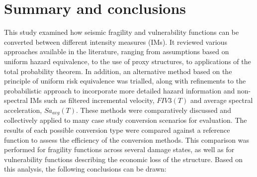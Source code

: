 \section{Summary and conclusions}
This study examined how seismic fragility and vulnerability functions can be converted between different intensity measures (IMs). It reviewed various approaches available in the literature, ranging from assumptions based on uniform hazard equivalence, to the use of proxy structures, to applications of the total probability theorem. In addition, an alternative method based on the principle of uniform risk equivalence was trialled, along with refinements to the probabilistic approach to incorporate more detailed hazard information and non-spectral IMs such as filtered incremental velocity, $FIV3(T)$ and average spectral acceleration, $Sa_{avg}(T)$. These methods were comparatively discussed and collectively applied to many case study conversion scenarios for evaluation. The results of each possible conversion type were compared against a reference function to assess the efficiency of the conversion methods. This comparison was performed for fragility functions across several damage states, as well as for vulnerability functions describing the economic loss of the structure. Based on this analysis, the following conclusions can be drawn:
